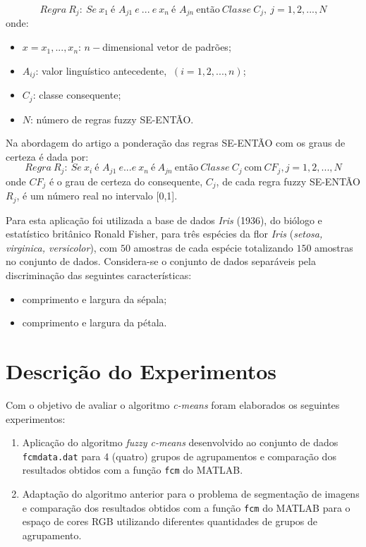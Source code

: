 \documentclass[12pt,a4paper]{article}
\numberwithin{equation}{section}
\begin{document}
{\begin{equation} \label{eq:eq1}
Regra~R_{j}:~Se~x_{1}~ \text{é }A_{j1}~e~...~e~x_{n}~\text{é }A_{jn}~\text{então}~Classe~C_{j},~j=1,2,...,N
\end{equation}
onde:
\begin{itemize}
\item $x={x_{1},...,x_{n}}$: $n-$dimensional vetor de padrões;
\item $A_{ij}$: valor linguístico antecedente, $~(i=1,2,...,n)$;
\item $C_{j}$: classe consequente;
\item $N$: número de regras fuzzy SE-ENTÃO.
\end{itemize}

Na abordagem do artigo a ponderação das regras SE-ENTÃO com os graus de certeza é dada por:
\begin{equation} \label{eq:eq2}
Regra~R_{j}:~Se~x_{i}~\text{é } A_{j1}~e...e~x_{n}~\text{é}~A_{jn}~\text{então}~Classe~C_{j}~\text{com}~CF_{j}, j=1,2,...,N
\end{equation}
onde $CF_{j}$ é o grau de certeza do consequente, $C_{j}$, de cada regra fuzzy SE-ENTÃO $R_{j}$, é um número real no intervalo [0,1].

Para esta aplicação foi utilizada a base de dados \textit{Iris} (1936), do biólogo e estatístico britânico Ronald Fisher, para três espécies da flor \textit{Iris} (\textit{setosa, virginica, versicolor}), com $50$ amostras de cada espécie totalizando $150$ amostras no conjunto de dados. Considera-se o conjunto de dados separáveis pela discriminação das seguintes características:

\begin{itemize}
\item comprimento e largura da sépala;
\item comprimento e largura da pétala.
\end{itemize}

\section{Descrição do Experimentos}
\label{section:descr}

Com o objetivo de avaliar o algoritmo \textit{c-means} foram elaborados os seguintes experimentos:

\begin{enumerate}
	\item Aplicação do algoritmo \textit{fuzzy c-means} desenvolvido ao conjunto de dados \texttt{fcmdata.dat} para 4 (quatro) grupos de agrupamentos e comparação dos resultados obtidos com a função \texttt{fcm} do MATLAB.
	\item Adaptação do algoritmo anterior para o problema de segmentação de imagens e comparação dos resultados obtidos com a função \texttt{fcm} do MATLAB para o espaço de cores RGB utilizando diferentes quantidades de grupos de agrupamento.
\end{enumerate}

}
\end{document}
